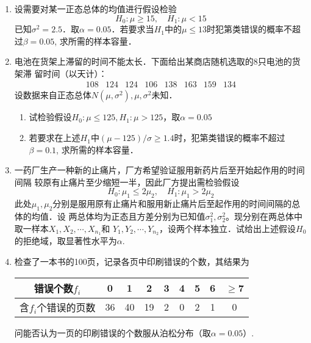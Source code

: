 \documentclass[10pt,a4paper]{article}
\begin{document}
\begin{enumerate}
    \item 设需要对某一正态总体的均值进行假设检验
    $$H_0:\mu \geq 15,\quad H_1:\mu <15$$
    已知$\sigma^2=2.5$．取$\alpha=0.05$．若要求当$H_1$中的$\mu\leq 13$时犯第\uppercase\expandafter{}类错误的概率不超过$\beta=0.05$,
    求所需的样本容量．
    \clearpage


    \item 电池在货架上滞留的时间不能太长．下面给出某商店随机选取的8只电池的货架滞
    留时间（以天计）：
    $$\begin{array}{cccccccc}
        108 & 124 & 124 & 106 & 138 & 163 & 159 & 134
    \end{array}$$
    设数据来自正态总体$N(\mu,\sigma^2),\mu,\sigma^2$未知．
    \begin{enumerate}
        \item 试检验假设$H_0:\mu \leq 125,H_1:\mu >125$，取$\alpha=0.05$
        \item 若要求在上述$H_1$中$(\mu-125)/\sigma\geq 1.4$时，犯第\uppercase\expandafter{}类错误的概率不超过$\beta=0.1$,
        求所需的样本容量．
    \end{enumerate}
    \clearpage



    \item 一药厂生产一种新的止痛片，厂方希望验证服用新药片后至开始起作用的时间间隔
    较原有止痛片至少缩短一半，因此厂方提出需检验假设
    $$H_0:\mu_1\leq 2\mu_2,\quad H_1:\mu_1>2\mu_2$$
    此处$\mu_1,\mu_2$分别是服用原有止痛片和服用新止痛片后至起作用的时间间隔的总体的均值．设
    两总体均为正态且方差分别为已知值$\sigma_1^2,\sigma_2^2$。现分别在两总体中取一样本$X_1,X_2,\cdots,X_{n_1}$和
    $Y_1,Y_2,\cdots,Y_{n_2}$，设两个样本独立．试给出上述假设$H_0$的拒绝域，取显著性水平为$\alpha$.
    \clearpage



    \item 检查了一本书的100页，记录各页中印刷错误的个数，其结果为
    \renewcommand{\arraystretch}{1.3} 
    \begin{table}[H]\centering
        \begin{tabular}{c|cccccccc}
        错误个数$f_i$    & 0  & 1  & 2  & 3 & 4 & 5 & 6 & $\geq$7 \\ \hline
        含$f_i$个错误的页数 & 36 & 40 & 19 & 2 & 0 & 2 & 1 & 0      
        \end{tabular}
    \end{table}
    \renewcommand{\arraystretch}{1.0} 
    问能否认为一页的印刷错误的个数服从泊松分布（取$\alpha=0.05$）.
    \clearpage





\end{enumerate}
\end{document}
